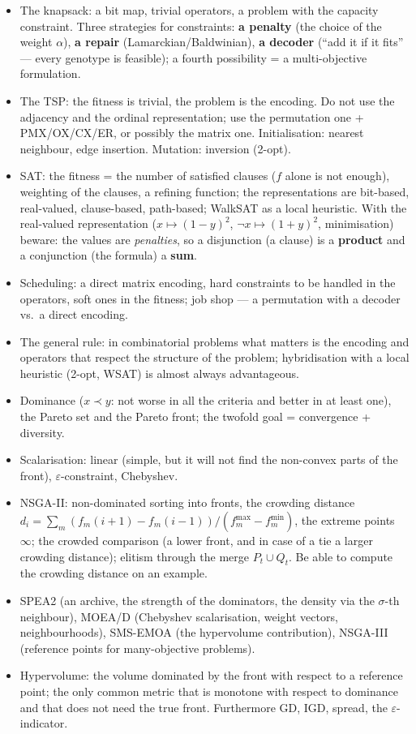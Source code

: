 \documentclass[11pt,a4paper]{article}
\theoremstyle{definition}
\providecommand{\uv}[1]{``#1''}
\begin{document}
\begin{itemize}
  (EA, RL, Bayesian, gradient-based), the performance estimate (weight sharing
  --- ENAS); DeepNEAT and CoDeepNEAT (modules + blueprints); ES for deep RL.
\item The knapsack: a bit map, trivial operators, a problem with the capacity
  constraint. Three strategies for constraints: \textbf{a penalty} (the choice
  of the weight $\alpha$), \textbf{a repair} (Lamarckian/Baldwinian),
  \textbf{a decoder} (\uv{add it if it fits} --- every genotype is feasible);
  a fourth possibility = a multi-objective formulation.
\item The TSP: the fitness is trivial, the problem is the encoding. Do not use
  the adjacency and the ordinal representation; use the permutation one +
  PMX/OX/CX/ER, or possibly the matrix one. Initialisation: nearest neighbour,
  edge insertion. Mutation: inversion (2-opt).
\item SAT: the fitness = the number of satisfied clauses ($f$ alone is not
  enough), weighting of the clauses, a refining function; the representations
  are bit-based, real-valued, clause-based, path-based; WalkSAT as a local
  heuristic.
  With the real-valued representation ($x \mapsto (1-y)^2$,
  $\neg x \mapsto (1+y)^2$, minimisation) beware: the values are
  \emph{penalties}, so a disjunction (a clause) is a \textbf{product} and a
  conjunction (the formula) a \textbf{sum}.
\item Scheduling: a direct matrix encoding, hard constraints to be handled in
  the operators, soft ones in the fitness; job shop --- a permutation with a
  decoder vs.\ a direct encoding.
\item The general rule: in combinatorial problems what matters is the encoding
  and operators that respect the structure of the problem; hybridisation with a
  local heuristic (2-opt, WSAT) is almost always advantageous.
\item Dominance ($x \prec y$: not worse in all the criteria and better in at
  least one), the Pareto set and the Pareto front; the twofold goal =
  convergence + diversity.
\item Scalarisation: linear (simple, but it will not find the non-convex parts
  of the front), $\varepsilon$-constraint, Chebyshev.
\item NSGA-II: non-dominated sorting into fronts, the crowding distance
  $d_i = \sum_m (f_m(i+1)-f_m(i-1))/(f_m^{\max}-f_m^{\min})$, the extreme points
  $\infty$; the crowded comparison (a lower front, and in case of a tie a larger
  crowding distance); elitism through the merge $P_t \cup Q_t$. Be able to
  compute the crowding distance on an example.
\item SPEA2 (an archive, the strength of the dominators, the density via the
  $\sigma$-th neighbour), MOEA/D (Chebyshev scalarisation, weight vectors,
  neighbourhoods), SMS-EMOA (the hypervolume contribution), NSGA-III (reference
  points for many-objective problems).
\item Hypervolume: the volume dominated by the front with respect to a reference
  point; the only common metric that is monotone with respect to dominance and
  that does not need the true front.
  Furthermore GD, IGD, spread, the $\varepsilon$-indicator.
\end{itemize}
\end{document}
